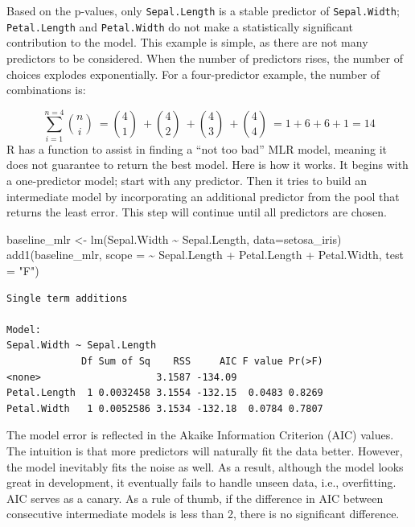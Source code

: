 \documentclass[
  letterpaper,
  DIV=11,
  numbers=noendperiod]{scrreprt}
\newenvironment{Shaded}{\begin{snugshade}}{\end{snugshade}}
\newcommand{\AttributeTok}[1]{\textcolor[rgb]{0.40,0.45,0.13}{#1}}
\newcommand{\FunctionTok}[1]{\textcolor[rgb]{0.28,0.35,0.67}{#1}}
\newcommand{\NormalTok}[1]{\textcolor[rgb]{0.00,0.23,0.31}{#1}}
\newcommand{\OtherTok}[1]{\textcolor[rgb]{0.00,0.23,0.31}{#1}}
\newcommand{\SpecialCharTok}[1]{\textcolor[rgb]{0.37,0.37,0.37}{#1}}
\newcommand{\StringTok}[1]{\textcolor[rgb]{0.13,0.47,0.30}{#1}}
\begin{document}
Based on the p-values, only \texttt{Sepal.Length} is a stable predictor
of \texttt{Sepal.Width}; \texttt{Petal.Length} and \texttt{Petal.Width}
do not make a statistically significant contribution to the model. This
example is simple, as there are not many predictors to be considered.
When the number of predictors rises, the number of choices explodes
exponentially. For a four-predictor example, the number of combinations
is:

\[\sum_{i=1}^{n=4} \binom{n}{i}\ = \binom{4}{1}\ + \binom{4}{2}\ + \binom{4}{3}\ + \binom{4}{4}\ = 1 + 6 + 6 + 1 = 14\]
R has a function to assist in finding a ``not too bad'' MLR model,
meaning it does not guarantee to return the best model. Here is how it
works. It begins with a one-predictor model; start with any predictor.
Then it tries to build an intermediate model by incorporating an
additional predictor from the pool that returns the least error. This
step will continue until all predictors are chosen.

\begin{Shaded}
\begin{Highlighting}[]
\NormalTok{baseline\_mlr }\OtherTok{\textless{}{-}} \FunctionTok{lm}\NormalTok{(Sepal.Width }\SpecialCharTok{\textasciitilde{}}\NormalTok{ Sepal.Length, }\AttributeTok{data=}\NormalTok{setosa\_iris)}
\FunctionTok{add1}\NormalTok{(baseline\_mlr, }\AttributeTok{scope =} \SpecialCharTok{\textasciitilde{}}\NormalTok{ Sepal.Length }\SpecialCharTok{+}\NormalTok{ Petal.Length }\SpecialCharTok{+}\NormalTok{ Petal.Width, }\AttributeTok{test =} \StringTok{"F"}\NormalTok{)}
\end{Highlighting}
\end{Shaded}

\begin{verbatim}
Single term additions

Model:
Sepal.Width ~ Sepal.Length
             Df Sum of Sq    RSS     AIC F value Pr(>F)
<none>                    3.1587 -134.09               
Petal.Length  1 0.0032458 3.1554 -132.15  0.0483 0.8269
Petal.Width   1 0.0052586 3.1534 -132.18  0.0784 0.7807
\end{verbatim}

The model error is reflected in the Akaike Information Criterion (AIC)
values. The intuition is that more predictors will naturally fit the
data better. However, the model inevitably fits the noise as well. As a
result, although the model looks great in development, it eventually
fails to handle unseen data, i.e., overfitting. AIC serves as a canary.
As a rule of thumb, if the difference in AIC between consecutive
intermediate models is less than 2, there is no significant difference.
\end{document}

